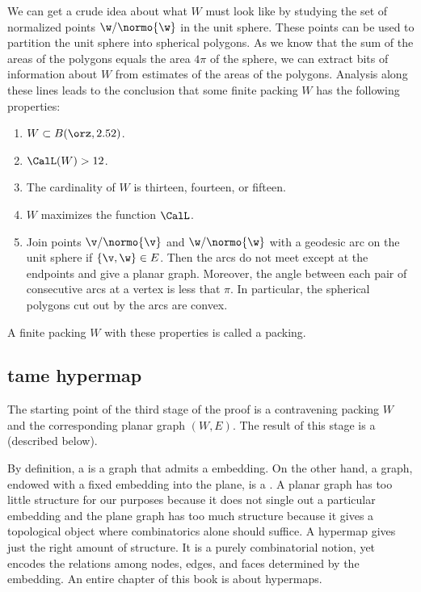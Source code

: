 We can get a crude idea about what $W$ must look like by studying the
set of normalized points $\w/\normo{\w}$ in the unit sphere.  These
points can be used to partition the unit sphere into spherical
polygons.  As we know that the sum of the areas of the polygons equals
the area $4\pi$ of the sphere, we can extract bits of information
about $W$ from estimates of the areas of the polygons.  Analysis along
these lines leads to the conclusion that some finite packing $W$
has the following 
properties:
\begin{enumerate}\wasitemize 
\item $W\subset B(\orz,2.52)$.
\item $\CalL(W) > 12$.
\item The cardinality of $W$ is thirteen, fourteen, or fifteen.
\item $W$ maximizes the function $\CalL$.
\item Join points $\v/\normo{\v}$ and $\w/\normo{\w}$ with a geodesic arc on the
unit sphere if $\{\v,\w\}\in E$.  Then the arcs do not meet except at the endpoints and
give a planar graph.  Moreover, the angle between each pair of consecutive arcs at a vertex is less
that $\pi$.  In particular, the spherical polygons cut out by the arcs are convex.
\end{enumerate}\wasitemize 
A finite packing $W$ with these properties is called a  packing.


\subsection{tame hypermap}

The starting point of the third stage of the proof is a contravening
packing $W$ and the corresponding planar graph $(W,E)$.  The result of
this stage is a  (described below).

By definition, a  is a graph that admits a
 embedding.  On the other hand, a graph, endowed with
a fixed embedding into the plane, is a .  A
planar graph has too little structure for our purposes because it
does not single out a particular embedding and the plane graph has too
much structure because it gives a topological object where combinatorics
alone should suffice.  A hypermap gives just the right amount of
structure.  It is a purely combinatorial notion, yet encodes the
relations among nodes, edges, and faces determined by the embedding.
An entire chapter of this book is about hypermaps.


